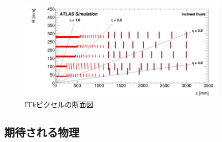 \begin{figure}[bpt]\centering
\includegraphics[width=10cm]{itk_pixel_cross_section}
\caption[ITkピクセルの断面図]{ITkピクセルの断面図\cite{1-3}}
\label{itk_pixel_cross_section}
\end{figure}

\subsection{期待される物理}
